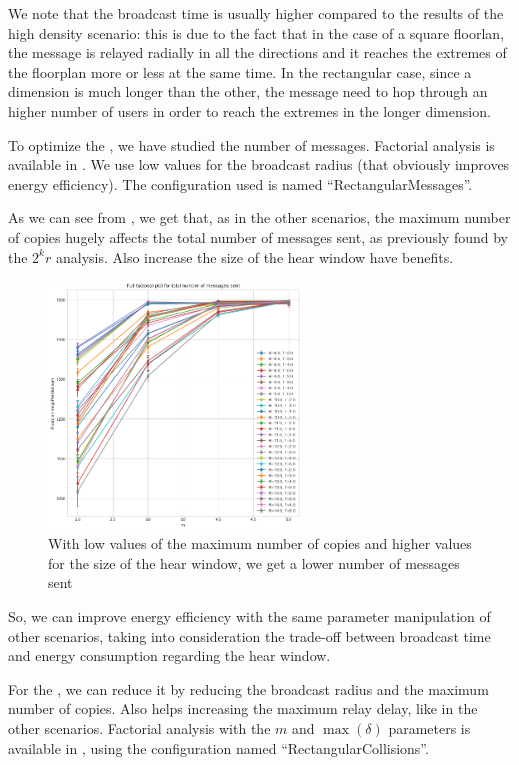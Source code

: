 We note that the broadcast time is usually higher compared to the results of the
high density scenario: this is due to the fact that in the case of a square
floorlan, the message is relayed radially in all the directions and it reaches
the extremes of the floorplan more or less at the same time. In the rectangular
case, since a dimension is much longer than the other, the message need to hop
through an higher number of users in order to reach the extremes in the longer
dimension.

To optimize the , we have studied the number of
messages. Factorial analysis is available in . We use low
values for the broadcast radius (that obviously improves energy efficiency). The
configuration used is named ``RectangularMessages''.

As we can see from , we get that, as in the other
scenarios, the maximum number of copies hugely affects the total number of
messages sent, as previously found by the \(2^{k}r\) analysis. Also increase the
size of the hear window have benefits.

\begin{figure}[htb]
	\centering
	\includegraphics[width=0.6\textwidth]{img/rect/messages-m-ffplot.png}
	\caption{With low values of the maximum number of copies and higher
	values for the size of the hear window, we get a lower number of
	messages sent}\label{fig:rectmessagesff}
\end{figure}

So, we can improve energy efficiency with the same parameter manipulation of
other scenarios, taking into consideration the trade-off between broadcast time
and energy consumption regarding the hear window.

For the , we can reduce it by reducing the
broadcast radius and the maximum number of copies. Also helps increasing the
maximum relay delay, like in the other scenarios. Factorial analysis with the
\(m\) and \(\max(\delta)\) parameters is available in ,
using the configuration named ``RectangularCollisions''.

